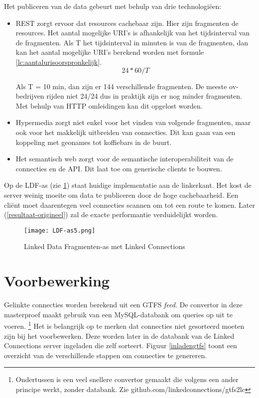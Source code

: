Het publiceren van de data gebeurt met behulp van drie technologi\"een: 
\begin{itemize}
\item REST zorgt ervoor dat resources cachebaar zijn. Hier zijn fragmenten de resources. Het aantal mogelijke URI's is afhankelijk van het tijdsinterval van de fragmenten. Als T het tijdsinterval in minuten is van de fragmenten, dan kan het aantal mogelijke URI's berekend worden met formule \ref{lc:aantalurisoorspronkelijk}.
\begin{equation} \label{lc:aantalurisoorspronkelijk}
24 * 60 / T
\end{equation}

Als T = 10 min, dan zijn er 144 verschillende fragmenten. De meeste ov-bedrijven rijden niet 24/24 dus in praktijk zijn er nog minder fragmenten. Met behulp van HTTP omleidingen kan dit opgelost worden.
\item Hypermedia zorgt niet enkel voor het vinden van volgende fragmenten, maar ook voor het makkelijk uitbreiden van connecties. Dit kan gaan van een koppeling met geonames tot koffiebars in de buurt.
\item Het semantisch web zorgt voor de semantische interoperabiliteit van de connecties en de API. Dit laat toe om generische clients te bouwen.
\end{itemize}

Op de LDF-as (zie \ref{ldf-lc5}) staat huidige implementatie aan de linkerkant. Het kost de server weinig moeite om data te publiceren door de hoge cachebaarheid. Een cli\"ent moet daarentegen veel connecties scannen om tot een route te komen. Later (\ref{resultaat-origineel}) zal de exacte performantie verduidelijkt worden.

\begin{figure}[h!]
\centering
\texttt{[image: LDF-as5.png]}
\caption{Linked Data Fragmenten-as met Linked Connections}
\label{ldf-lc5}
\end{figure}

\section{Voorbewerking}

Gelinkte connecties worden berekend uit een GTFS \textit{feed}. De convertor in deze masterproef maakt gebruik van een MySQL-databank om queries op uit te voeren. \footnote{Ondertussen is een veel snellere convertor gemaakt die volgens een ander principe werkt, zonder databank. Zie github.com/linkedconnections/gtfs2lc} Het is belangrijk op te merken dat connecties niet gesorteerd moeten zijn bij het voorbewerken. Deze worden later in de databank van de Linked Connections server ingeladen die zelf sorteert. Figuur \ref{inladengtfs} toont een overzicht van de verschillende stappen om connecties te genereren.

